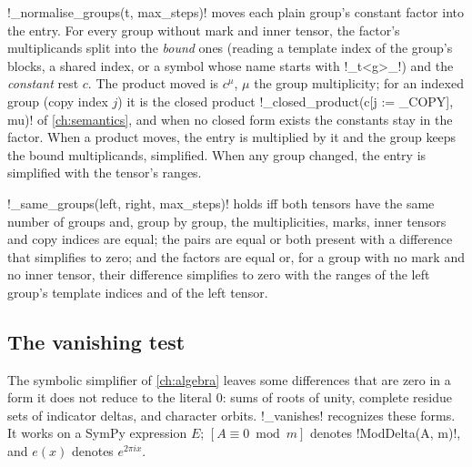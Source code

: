 \begin{algorithm}\label{alg:proofs-normalise-groups}
\py!_normalise_groups(t, max_steps)! moves each plain group's constant factor into the entry. For every group without mark and inner tensor, the factor's multiplicands split into the \emph{bound} ones (reading a template index of the group's blocks, a shared index, or a symbol whose name starts with \code!_t<g>_!) and the \emph{constant} rest $c$. The product moved is $c^{\mu}$, $\mu$ the group multiplicity; for an indexed group (copy index $j$) it is the closed product \py!_closed_product(c[j := _COPY], mu)! of \cref{ch:semantics}, and when no closed form exists the constants stay in the factor. When a product moves, the entry is multiplied by it and the group keeps the bound multiplicands, simplified. When any group changed, the entry is simplified with the tensor's ranges.
\end{algorithm}

\begin{algorithm}\label{alg:proofs-same-groups}
\py!_same_groups(left, right, max_steps)! holds iff both tensors have the same number of groups and, group by group, the multiplicities, marks, inner tensors and copy indices are equal; the pairs are equal or both present with a difference that simplifies to zero; and the factors are equal or, for a group with no mark and no inner tensor, their difference simplifies to zero with the ranges of the left group's template indices and of the left tensor.
\end{algorithm}

\subsection{The vanishing test}\label{sec:proofs-vanishes}

The symbolic simplifier of \cref{ch:algebra} leaves some differences that are zero in a form it does not reduce to the literal $0$: sums of roots of unity, complete residue sets of indicator deltas, and character orbits. \py!_vanishes! recognizes these forms. It works on a SymPy expression $E$; $[A\equiv 0\bmod m]$ denotes \py!ModDelta(A, m)!, and $e(x)$ denotes $e^{2\pi i x}$.

